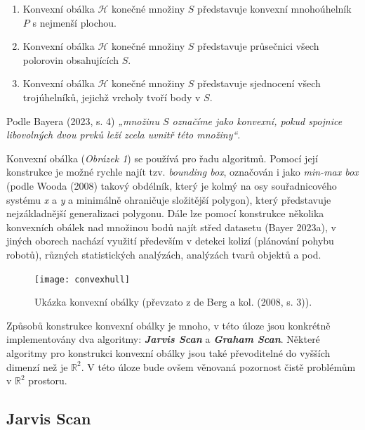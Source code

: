 \begin{enumerate}
  \item Konvexní obálka $\mathcal{H}$ konečné množiny $S$ představuje konvexní mnohoúhelník $P$ s nejmenší plochou.
  \item Konvexní obálka $\mathcal{H}$ konečné množiny $S$ představuje průsečnici všech polorovin obsahujících $S$.
  \item Konvexní obálka $\mathcal{H}$ konečné množiny $S$ představuje sjednocení všech trojúhelníků, jejichž vrcholy tvoří body v $S$.
\end{enumerate}

\par Podle Bayera (2023, s. 4) \emph{„množinu $S$ označíme jako konvexní, pokud spojnice libovolných dvou prvků leží zcela uvnitř této množiny“}.

\par Konvexní obálka (\emph{Obrázek 1}) se používá pro řadu algoritmů. Pomocí její konstrukce je možné rychle najít tzv. \emph{bounding box}, označován i jako \emph{min-max box} (podle Wooda (2008) takový obdélník, který je kolmý na osy souřadnicového systému \emph{x} a \emph{y} a minimálně ohraničuje složitější polygon), který představuje nejzákladnější generalizaci polygonu. Dále lze pomocí konstrukce několika konvexních obálek nad množinou bodů najít střed datasetu (Bayer 2023a), v jiných oborech nachází využití především v detekci kolizí (plánování pohybu robotů), různých statistických analýzách, analýzách tvarů objektů a pod. 

\begin{figure}[h]
\centering
\texttt{[image: convexhull]} 
    \caption{Ukázka konvexní obálky (převzato z de Berg a kol. (2008, s. 3)).}
\end{figure}

\par Způsobů konstrukce konvexní obálky je mnoho, v této úloze jsou konkrétně implementovány dva algoritmy: \textbf{\emph{Jarvis Scan}} a \textbf{\emph{Graham Scan}}. Některé algoritmy pro konstrukci konvexní obálky jsou také převoditelné do vyšších dimenzí než je  $\mathbb{R}^2$. V této úloze bude ovšem věnovaná pozornost čistě problémům v $\mathbb{R}^2$ prostoru.
\bigbreak

\subsection*{Jarvis Scan}


